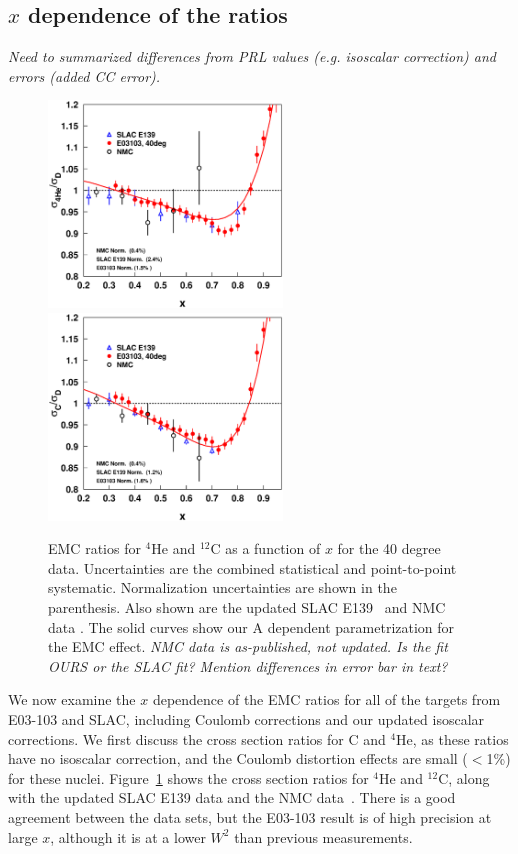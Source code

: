 \subsection{$x$ dependence of the ratios}\label{xdepresult.ssec}


\textit{Need to summarized differences from PRL values (e.g. isoscalar
correction) and errors (added CC error).}

\begin{figure}[htbp]
\begin{center}
\includegraphics[width=.44\textwidth,height=55mm]{plots/slacWithallcorr_e03103_40deg_emc_x_he4.eps}
\includegraphics[width=.44\textwidth,height=55mm]{plots/slacWithallcorr_e03103_40deg_emc_x_c12.eps}
\caption{EMC ratios for $^4$He and $^{12}$C as a function of $x$ for the 40
degree data. Uncertainties are the combined statistical and point-to-point
systematic. Normalization uncertainties are shown in the parenthesis. Also
shown are the updated SLAC E139~\cite{slace139} and NMC data
\cite{Arneodo:1995cs, Amaudruz:1995tq}. The solid curves show our A dependent
parametrization for
the EMC effect.
\textit{NMC data is as-published, not updated.  Is the fit OURS or the SLAC
fit?  Mention differences in error bar in text?}
\label{emc_x_40deg_he4_fig}}
\end{center}
\end{figure}


We now examine the $x$ dependence of the EMC ratios for all of the targets
from E03-103 and SLAC, including Coulomb corrections and our updated isoscalar
corrections. We first discuss the cross section ratios for C and $^4$He, as
these ratios have no isoscalar correction, and the Coulomb distortion effects
are small ($<$1\%) for these nuclei. Figure~\ref{emc_x_40deg_he4_fig} shows
the cross section ratios for $^4$He and $^{12}$C, along with the updated SLAC
E139 data and the NMC data~\cite{Amaudruz:1995tq,Arneodo:1995cs}. There is a
good agreement between the data sets, but the E03-103 result is of high
precision at large $x$, although it is at a lower $W^2$ than previous
measurements.



